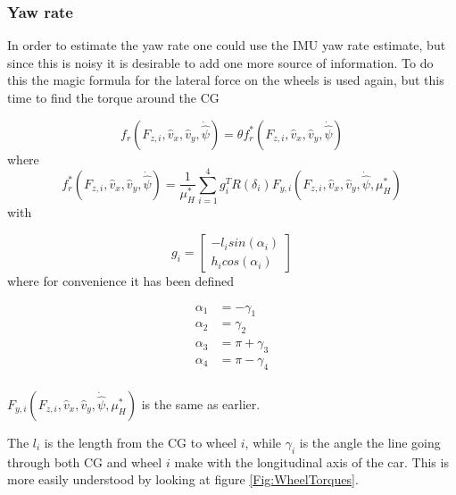 \subsubsection{Yaw rate}

In order to estimate the yaw rate one could use the \gls{IMU} yaw rate estimate, but since this is noisy it is desirable to add one more source of information. To do this the magic formula for the lateral force on the wheels is used again, but this time to find the torque around the CG

\begin{equation}
    f_r(F_{z,i}, \hat{v}_x, \hat{v}_y, \dot{\hat{\psi}}) =\theta f_r^*(F_{z,i}, \hat{v}_x, \hat{v}_y, \dot{\hat{\psi}}) 
\end{equation}
where
\begin{equation}
    f_r^*(F_{z,i}, \hat{v}_x, \hat{v}_y, \dot{\hat{\psi}}) = \frac{1}{\mu_H^*}\sum_{i=1}^{4}g_i^TR(\delta_i)F_{y,i}(F_{z,i}, \hat{v}_x, \hat{v}_y, \dot{\hat{\psi}}, \mu_H^*)
\end{equation}
with 

\begin{equation}
    g_i = \begin{bmatrix} -l_i sin(\alpha_i) \\ h_i cos(\alpha_i)
    \end{bmatrix}
\end{equation}
where for convenience it has been defined

\begin{align}
    \alpha_1 & = -\gamma_1 \\
    \alpha_2 & = \gamma_2 \\
    \alpha_3 & = \pi + \gamma_3 \\
    \alpha_4 & = \pi -\gamma_4 \\
\end{align}

$F_{y,i}(F_{z,i}, \hat{v}_x, \hat{v}_y, \dot{\hat{\psi}}, \mu_H^*)$ is the same as earlier.

The $l_i$ is the length from the \gls{CG} to wheel $i$, while $\gamma_i$ is the angle the line going through both CG and wheel $i$ make with the longitudinal axis of the car. This is more easily understood by looking at figure \ref{Fig:WheelTorques}. 

